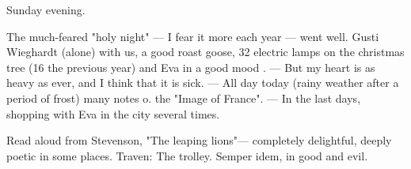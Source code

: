 Sunday evening.

The much-feared "holy night" — I fear it more each year — went well. Gusti Wieghardt (alone) with us, a good roast goose, 32 electric lamps on the christmas tree (16 the previous year) and Eva in a good mood . — But my heart is as heavy as ever, and I think that it is sick. — All day today (rainy weather after a period of frost) many notes o. the "Image of France". — In the last days, shopping with Eva in the city several times.

Read aloud from Stevenson, "The leaping lions"— completely delightful, deeply poetic in some places. \missing Traven: The trolley. Semper idem, in good and evil.
